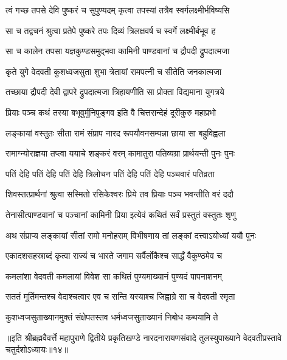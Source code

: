 \twolineshloka
{त्वं गच्छ तपसे देवि पुष्करं च सुपुण्यदम्}
{कृत्वा तपस्यां तत्रैव स्वर्गलक्ष्मीर्भविष्यसि}%

\twolineshloka
{सा च तद्वचनं श्रुत्वा प्रतेपे पुष्करे तपः}
{दिव्यं त्रिलक्षवर्ष च स्वर्गे लक्ष्मीर्बभूव ह}%

\twolineshloka
{सा च कालेन तपसा यज्ञकुण्डसमुद्भवा}
{कामिनी पाण्डवानां च द्रौपदी द्रुपदात्मजा}%

\twolineshloka
{कृते युगे वेदवती कुशध्वजसुता शुभा}
{त्रेतायां रामपत्नी च सीतेति जनकात्मजा}%

\twolineshloka
{तच्छाया द्रौपदी देवी द्वापरे द्रुपदात्मजा}
{त्रिहायणीति सा प्रोक्ता विद्यमाना युगत्रये}%


\twolineshloka
{प्रियाः पञ्च कथं तस्या बभूवुर्मुनिपुङ्गव}
{इति वै चित्तसन्देहं दूरीकुरु महाप्रभो}%


\twolineshloka
{लङ्कायां वस्तुतः सीता रामं संप्राप नारद}
{रूपयौवनसम्पन्ना छाया सा बहुविह्वला}%

\twolineshloka
{रामाग्न्योराज्ञया तप्त्वा ययाचे शङ्करं वरम्}
{कामातुरा पतिव्यग्रा प्रार्थयन्ती पुनः पुनः}%

\twolineshloka
{पतिं देहि पतिं देहि पतिं देहि त्रिलोचन}
{पतिं देहि पतिं देहि पञ्चवारं पतिव्रता}%

\twolineshloka
{शिवस्तत्प्रार्थनां श्रुत्वा सस्मितो रसिकेश्वरः}
{प्रिये तव प्रियाः पञ्च भवन्तीति वरं ददौ}%

\twolineshloka
{तेनासीत्पाण्डवानां च पञ्चानां कामिनी प्रिया}
{इत्येवं कथितं सर्वं प्रस्तुतं वस्तुतः शृणु}%

\twolineshloka
{अथ संप्राप्य लङ्कायां सीतां रामो मनोहराम्}
{विभीषणाय तां लङ्कां दत्त्वाऽयोध्यां ययौ पुनः}%

\twolineshloka
{एकादशसहस्राब्दं कृत्वा राज्यं च भारते}
{जगाम सर्वैर्लोकैश्च सार्द्धं वैकुण्ठमेव च}%

\twolineshloka
{कमलांशा वेदवती कमलायां विवेश सा}
{कथितं पुण्यमाख्यानं पुण्यदं पापनाशनम्}%

\twolineshloka
{सततं मूर्तिमन्तश्च वेदाश्चत्वार एव च}
{सन्ति यस्याश्च जिह्वाग्रे सा च वेदवती स्मृता}%

\twolineshloka
{कुशध्वजसुताख्यानमुक्तं संक्षेपतस्तव}
{धर्मध्वजसुताख्यानं निबोध कथयामि ते}%

॥इति श्रीब्रह्मवैवर्त्ते महापुराणे द्वितीये प्रकृतिखण्डे नारदनारायणसंवादे तुलस्युपाख्याने वेदवतीप्रस्तावे चतुर्दशोऽध्यायः॥१४॥
